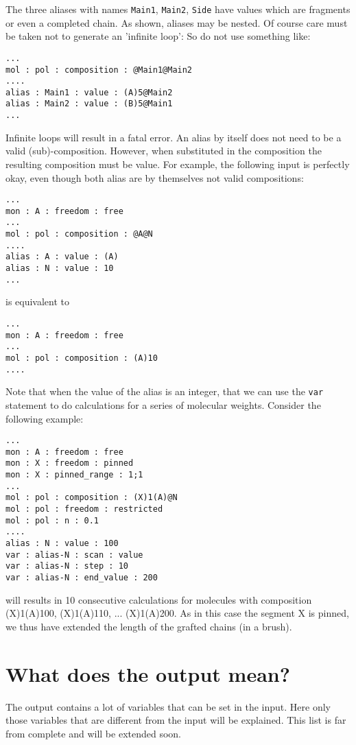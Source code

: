 \documentclass{article}
\begin{document}
The three aliases with names {\tt Main1}, {\tt Main2}, {\tt Side} have values which are fragments or even a completed chain. As shown, aliases may be nested. 
Of course care must be taken not to generate an 'infinite loop': So do not use something like:
\begin{verbatim} 
...
mol : pol : composition : @Main1@Main2
....
alias : Main1 : value : (A)5@Main2
alias : Main2 : value : (B)5@Main1
...
\end{verbatim}
Infinite loops will result in a fatal error. An alias by itself does not need to be a valid (sub)-composition. However, when substituted in the composition the resulting composition must be value. For example, the following input is perfectly okay, even though both alias are by themselves not valid compositions:
\begin{verbatim} 
...
mon : A : freedom : free
...
mol : pol : composition : @A@N
....
alias : A : value : (A)
alias : N : value : 10
...
\end{verbatim}
is equivalent to 
\begin{verbatim} 
...
mon : A : freedom : free
...
mol : pol : composition : (A)10
....
\end{verbatim}
Note that when the value of the alias is an integer, that we can use the {\tt var} statement to do calculations for a series of molecular weights. Consider the following example:
\begin{verbatim} 
...
mon : A : freedom : free
mon : X : freedom : pinned
mon : X : pinned_range : 1;1
...
mol : pol : composition : (X)1(A)@N
mol : pol : freedom : restricted
mol : pol : n : 0.1
....
alias : N : value : 100
var : alias-N : scan : value
var : alias-N : step : 10
var : alias-N : end_value : 200
\end{verbatim}
will results in 10 consecutive calculations for molecules with composition (X)1(A)100, (X)1(A)110, ... (X)1(A)200. As in this case the segment X is pinned, we thus have extended the length of the grafted chains (in a brush).  

\section{What does the output mean?}

The output contains a lot of variables that can be set in the input. Here only those variables that are different from the input will be explained. This list is far from complete and will be extended soon.
\end{document}
